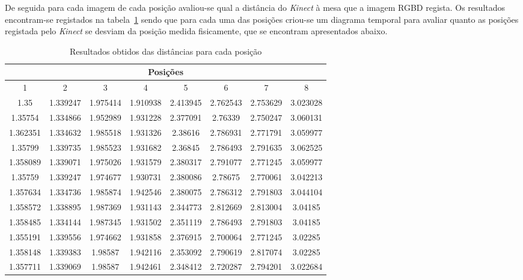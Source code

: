 De seguida para cada imagem de cada posição avaliou-se qual a distância do \emph{Kinect} à mesa que a imagem RGBD regista. Os resultados encontram-se registados na tabela~\ref{res:exp_res_obtidos} sendo que para cada uma das posições criou-se um diagrama temporal para avaliar quanto as posições registada pelo \emph{Kinect} se desviam da posição medida fisicamente, que se encontram apresentados abaixo.


\begin{table}[!h]
\begin{center}
\begin{tabular} { c c c c c c c c }

\hline
\multicolumn{8}{c}{ Posições }\\
\hline
 1 & 2 & 3 & 4 & 5 & 6 & 7 & 8 \\
\hline
1.35 & 1.339247 & 1.975414 & 1.910938 & 2.413945 & 2.762543 & 2.753629 & 3.023028 \\
1.35754 & 1.334866 & 1.952989 & 1.931228 & 2.377091 & 2.76339 & 2.750247 & 3.060131 \\
1.362351 & 1.334632 & 1.985518 & 1.931326 & 2.38616 & 2.786931 & 2.771791 & 3.059977 \\
1.35799 & 1.339735 & 1.985523 & 1.931682 & 2.36845 & 2.786493 & 2.791635 & 3.062525 \\
1.358089 & 1.339071 & 1.975026 & 1.931579 & 2.380317 & 2.791077 & 2.771245 & 3.059977 \\
1.35759 & 1.339247 & 1.974677 & 1.930731 & 2.380086 & 2.78675 & 2.770061 & 3.042213 \\
1.357634 & 1.334736 & 1.985874 & 1.942546 & 2.380075 & 2.786312 & 2.791803 & 3.044104 \\
1.358572 & 1.338895 & 1.987369 & 1.931143 & 2.344773 & 2.812669 & 2.813004 & 3.04185 \\
1.358485 & 1.334144 & 1.987345 & 1.931502 & 2.351119 & 2.786493 & 2.791803 & 3.04185 \\
1.355191 & 1.339556 & 1.974662 & 1.931858 & 2.376915 & 2.700064 & 2.771245 & 3.02285 \\
1.358148 & 1.339383 & 1.98587 & 1.942116 & 2.353092 & 2.790619 & 2.817074 & 3.02285 \\
1.357711 & 1.339069 & 1.98587 & 1.942461 & 2.348412 & 2.720287 & 2.794201 & 3.022684 \\
\hline
\end{tabular}
	\caption{Resultados obtidos das distâncias para cada posição}
	\label{res:exp_res_obtidos}
\end{center}
\end{table}


